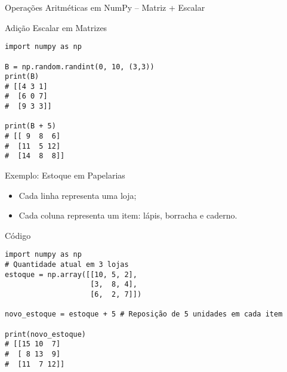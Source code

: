 \begin{frame}[fragile]{Operações Aritméticas em NumPy – Matriz + Escalar}
    \begin{exampleblock}{Adição Escalar em Matrizes}
        \begin{verbatim}
import numpy as np

B = np.random.randint(0, 10, (3,3))
print(B)
# [[4 3 1]
#  [6 0 7]
#  [9 3 3]]

print(B + 5)
# [[ 9  8  6]
#  [11  5 12]
#  [14  8  8]]
\end{verbatim}
    \end{exampleblock}
\end{frame}

\begin{frame}[fragile]{Exemplo: Estoque em Papelarias}
    \begin{itemize}
        \item Cada linha representa uma loja;
        \item Cada coluna representa um item: lápis, borracha e caderno.
    \end{itemize}
    \begin{block}{Código}
        \begin{verbatim}
import numpy as np
# Quantidade atual em 3 lojas
estoque = np.array([[10, 5, 2],    
                    [3,  8, 4],    
                    [6,  2, 7]])   

novo_estoque = estoque + 5 # Reposição de 5 unidades em cada item

print(novo_estoque)
# [[15 10  7]
#  [ 8 13  9]
#  [11  7 12]]
\end{verbatim}
    \end{block}
\end{frame}

